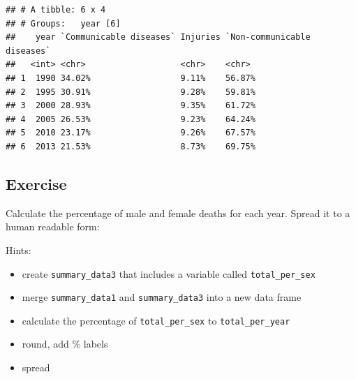 \documentclass[]{book}
\makeatletter
\newenvironment{Shaded}{\begin{snugshade}}{\end{snugshade}}
\newcommand{\CommentTok}[1]{\textcolor[rgb]{0.56,0.35,0.01}{\textit{#1}}}
\newcommand{\DataTypeTok}[1]{\textcolor[rgb]{0.13,0.29,0.53}{#1}}
\newcommand{\DecValTok}[1]{\textcolor[rgb]{0.00,0.00,0.81}{#1}}
\newcommand{\KeywordTok}[1]{\textcolor[rgb]{0.13,0.29,0.53}{\textbf{#1}}}
\newcommand{\NormalTok}[1]{#1}
\newcommand{\OperatorTok}[1]{\textcolor[rgb]{0.81,0.36,0.00}{\textbf{#1}}}
\newcommand{\StringTok}[1]{\textcolor[rgb]{0.31,0.60,0.02}{#1}}
\providecommand{\tightlist}{%
  \setlength{\itemsep}{0pt}\setlength{\parskip}{0pt}}
\newenvironment{kframe}{%
\medskip{}
\setlength{\fboxsep}{.8em}
 \def\at@end@of@kframe{}%
 \ifinner\ifhmode%
  \def\at@end@of@kframe{\end{minipage}}%
  \begin{minipage}{\columnwidth}%
 \fi\fi%
 \def\FrameCommand##1{\hskip\@totalleftmargin \hskip-\fboxsep
 \colorbox{shadecolor}{##1}\hskip-\fboxsep
     \hskip-\linewidth \hskip-\@totalleftmargin \hskip\columnwidth}%
 \MakeFramed {\advance\hsize-\width
   \@totalleftmargin\z@ \linewidth\hsize
   \@setminipage}}%
 {\par\unskip\endMakeFramed%
 \at@end@of@kframe}
\renewenvironment{Shaded}{\begin{kframe}}{\end{kframe}}
\theoremstyle{definition}
\theoremstyle{definition}
\theoremstyle{definition}
\theoremstyle{remark}
\makeatother
\begin{document}
\begin{Shaded}
\end{Shaded}

\begin{verbatim}
## # A tibble: 6 x 4
## # Groups:   year [6]
##    year `Communicable diseases` Injuries `Non-communicable diseases`
##   <int> <chr>                   <chr>    <chr>                      
## 1  1990 34.02%                  9.11%    56.87%                     
## 2  1995 30.91%                  9.28%    59.81%                     
## 3  2000 28.93%                  9.35%    61.72%                     
## 4  2005 26.53%                  9.23%    64.24%                     
## 5  2010 23.17%                  9.26%    67.57%                     
## 6  2013 21.53%                  8.73%    69.75%
\end{verbatim}

\hypertarget{exercise-14}{%
\subsection{Exercise}\label{exercise-14}}

Calculate the percentage of male and female deaths for each year. Spread
it to a human readable form:

Hints:

\begin{itemize}
\tightlist
\item
  create \texttt{summary\_data3} that includes a variable called
  \texttt{total\_per\_sex}
\item
  merge \texttt{summary\_data1} and \texttt{summary\_data3} into a new
  data frame
\item
  calculate the percentage of \texttt{total\_per\_sex} to
  \texttt{total\_per\_year}
\item
  round, add \% labels
\item
  spread
\end{itemize}
\end{document}
